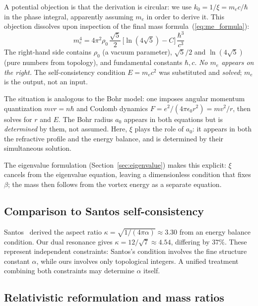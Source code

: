 \documentclass[11pt,a4paper]{article}
\begin{document}
A potential objection is that the derivation is circular: we use
$k_0 = 1/\xi = m_e c/\hbar$ in the phase integral, apparently
assuming $m_e$ in order to derive it.  This objection dissolves
upon inspection of the final mass formula~(\ref{eq:me_formula}):
\begin{equation*}
  m_e^4 = 4\pi^2\rho_0\,\frac{\sqrt{5}}{2}\,
    \bigl[\ln(4\sqrt{5}) - C\bigr]\,\frac{\hbar^3}{c^3}
\end{equation*}
The right-hand side contains $\rho_0$ (a vacuum parameter),
$\sqrt{5}/2$ and $\ln(4\sqrt{5})$ (pure numbers from topology),
and fundamental constants $\hbar, c$.  \emph{No $m_e$ appears on
the right.}  The self-consistency condition $E = m_e c^2$ was
substituted and \emph{solved}; $m_e$ is the output, not an input.

The situation is analogous to the Bohr model: one imposes
angular momentum quantization $mvr = n\hbar$ and Coulomb dynamics
$F = e^2/(4\pi\epsilon_0 r^2) = mv^2/r$, then solves for $r$ and
$E$.  The Bohr radius $a_0$ appears in both equations but is
\emph{determined} by them, not assumed.  Here, $\xi$ plays the
role of $a_0$: it appears in both the refractive profile and the
energy balance, and is determined by their simultaneous solution.

The eigenvalue formulation (Section~\ref{sec:eigenvalue}) makes
this explicit: $\xi$ cancels from the eigenvalue equation, leaving
a dimensionless condition that fixes $\beta$; the mass then follows
from the vortex energy as a separate equation.

\subsection{Comparison to Santos self-consistency}

Santos~\cite{Santos} derived the aspect ratio $\kappa = \sqrt{1/(4\pi\alpha)} \approx 3.30$
from an energy balance condition.  Our dual resonance gives
$\kappa = 12/\sqrt{7} \approx 4.54$, differing by $37\%$.  These
represent independent constraints: Santos's condition involves the
fine structure constant $\alpha$, while ours involves only topological
integers.  A unified treatment combining both constraints may
determine $\alpha$ itself.

\subsection{Relativistic reformulation and mass ratios}
\label{sec:eft}
\end{document}
